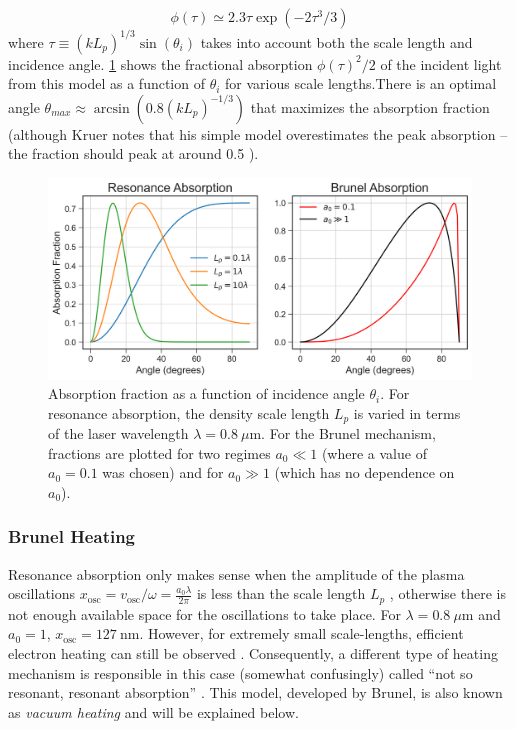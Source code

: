 \begin{equation}
	\phi(\tau) \simeq 2.3 \tau \exp(-2 \tau^3 / 3)
\end{equation}
where $\tau \equiv (k L_p)^{1/3} \sin(\theta_i)$ takes into account both the scale length and incidence angle. \cref{fig:absorption} shows the fractional absorption $\phi(\tau)^2/2$ of the incident light from this model as a function of $\theta_i$ for various scale lengths.There is an optimal angle $\theta_{max} \approx \arcsin(0.8 (k L_p)^{-1/3})$ that maximizes the absorption fraction (although Kruer notes that his simple model overestimates the peak absorption -- the  fraction should peak at around 0.5 \cite{Kruer_2003_Plasma}). 

\begin{figure}
	\centering 
	\includegraphics[width=\linewidth]{planning/images/absorption.png}
	\caption{Absorption fraction as a function of incidence angle $\theta_i$. For resonance absorption, the density scale length $L_p$ is varied in terms of the laser wavelength $\lambda = \SI{0.8}{\mu \meter}$. For the Brunel mechanism, fractions are plotted for two regimes $a_0 \ll 1$ (where a value of $a_0 = 0.1$ was chosen) and for $a_0 \gg 1$ (which has no dependence on $a_0$).}
	\label{fig:absorption}
\end{figure}

\subsubsection{Brunel Heating}
Resonance absorption only makes sense when the amplitude of the plasma oscillations $x_\text{osc} = v_\text{osc} / \omega = \frac{a_0 \lambda}{2 \pi}$ is less than the scale length $L_p$ \cite{Gibbon_2005_Plasma}, otherwise there is not enough available space for the oscillations to take place. For $\lambda = \SI{0.8}{\mu \meter}$ and $a_0 = 1$, $x_\text{osc} = \SI{127}{\nano \meter}$. However, for extremely small scale-lengths, efficient electron heating can still be observed \cite{Grimes_1999_PRL}. Consequently, a different type of heating mechanism is responsible in this case (somewhat confusingly) called ``not so resonant, resonant absorption'' \cite{Brunel_1987_PRL}. This model, developed by Brunel, is also known as \emph{vacuum heating} and will be explained below. 

